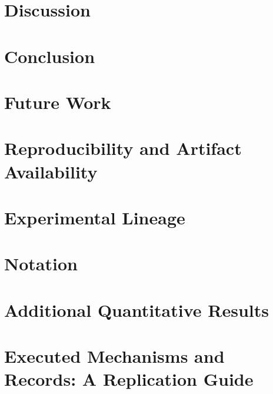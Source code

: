 \documentclass[11pt]{article}
\begin{document}
\section{Discussion}\label{sec:discussion}


\section{Conclusion}\label{sec:conclusion}


\section{Future Work}\label{sec:future}


\section{Reproducibility and Artifact Availability}\label{sec:repro}


\appendix
\section{Experimental Lineage}\label{app:lineage}


\section{Notation}\label{app:notation}


\section{Additional Quantitative Results}\label{app:quant}


\section{Executed Mechanisms and Records: A Replication Guide}\label{app:mech}




\end{document}

